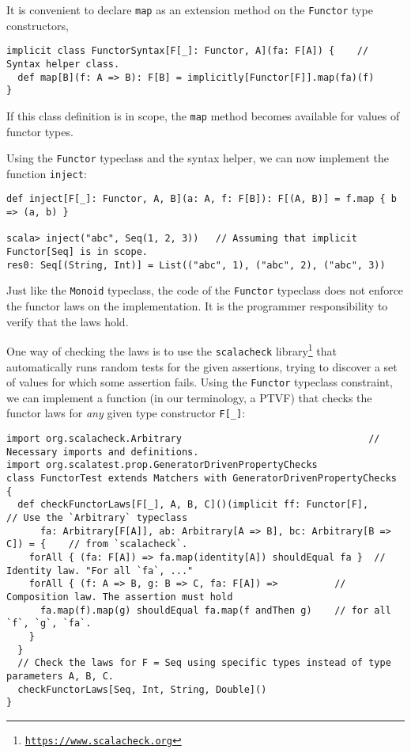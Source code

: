 It is convenient to declare \lstinline!map! as an extension method
on the \lstinline!Functor! type constructors,
\begin{lstlisting}
implicit class FunctorSyntax[F[_]: Functor, A](fa: F[A]) {    // Syntax helper class.
  def map[B](f: A => B): F[B] = implicitly[Functor[F]].map(fa)(f)
}
\end{lstlisting}
If this class definition is in scope, the \lstinline!map! method
becomes available for values of functor types.

Using the \lstinline!Functor! typeclass and the syntax helper, we
can now implement the function \lstinline!inject!:
\begin{lstlisting}
def inject[F[_]: Functor, A, B](a: A, f: F[B]): F[(A, B)] = f.map { b => (a, b) }

scala> inject("abc", Seq(1, 2, 3))   // Assuming that implicit Functor[Seq] is in scope.
res0: Seq[(String, Int)] = List(("abc", 1), ("abc", 2), ("abc", 3))
\end{lstlisting}
 Just like the \lstinline!Monoid! typeclass, the code of the \lstinline!Functor!
typeclass does not enforce the functor laws on the implementation.
It is the programmer responsibility to verify that the laws hold.

One way of checking the laws is to use the \texttt{scalacheck} library\footnote{\texttt{\href{https://www.scalacheck.org}{https://www.scalacheck.org}}}
that automatically runs random tests for the given assertions, trying
to discover a set of values for which some assertion fails. Using
the \lstinline!Functor! typeclass constraint, we can implement a
function (in our terminology, a PTVF) that checks the functor laws
for \emph{any} given type constructor \lstinline!F[_]!:
\begin{lstlisting}
import org.scalacheck.Arbitrary                                 // Necessary imports and definitions.
import org.scalatest.prop.GeneratorDrivenPropertyChecks
class FunctorTest extends Matchers with GeneratorDrivenPropertyChecks {
  def checkFunctorLaws[F[_], A, B, C]()(implicit ff: Functor[F],     // Use the `Arbitrary` typeclass
      fa: Arbitrary[F[A]], ab: Arbitrary[A => B], bc: Arbitrary[B => C]) = {    // from `scalacheck`.
    forAll { (fa: F[A]) => fa.map(identity[A]) shouldEqual fa }  // Identity law. "For all `fa`, ..."
    forAll { (f: A => B, g: B => C, fa: F[A]) =>          // Composition law. The assertion must hold
      fa.map(f).map(g) shouldEqual fa.map(f andThen g)    // for all `f`, `g`, `fa`.
    }
  }
  // Check the laws for F = Seq using specific types instead of type parameters A, B, C.
  checkFunctorLaws[Seq, Int, String, Double]()
}
\end{lstlisting}

